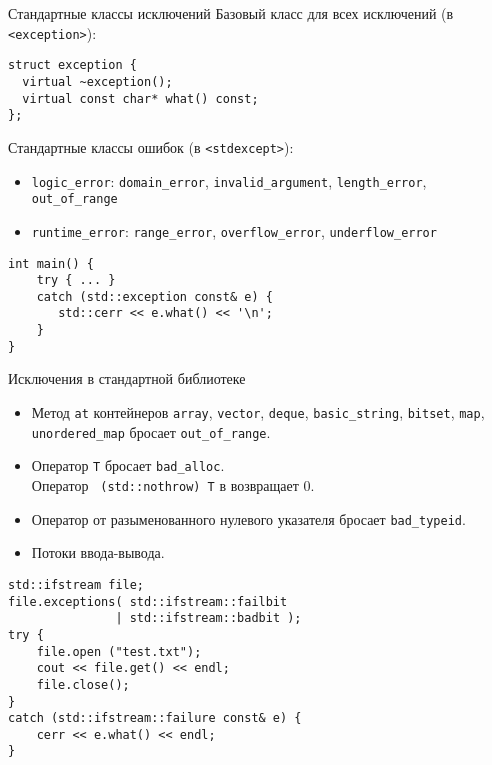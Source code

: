 \documentclass[aspectration=1610,t]{beamer}
\begin{document}
\begin{frame}[fragile]{Стандартные классы исключений}
    Базовый класс для всех исключений (в {\tt <exception>}):
    \begin{lstlisting}
struct exception {
  virtual ~exception();
  virtual const char* what() const;
}; 
    \end{lstlisting}

    Стандартные классы ошибок (в {\tt <stdexcept>}):\\
    \begin{itemize}
        \item {\tt logic\_error}: 
     {\tt domain\_error}, {\tt invalid\_argument}, {\tt length\_error}, {\tt
     out\_of\_range}\\
        \item {\tt runtime\_error}: 
        {\tt range\_error},
        {\tt overflow\_error}, 
        {\tt underflow\_error}
    \end{itemize}

\begin{lstlisting}
int main() {
    try { ... }
    catch (std::exception const& e) {
       std::cerr << e.what() << '\n';
    }
}
\end{lstlisting}
\end{frame}
 

\begin{frame}[fragile]{Исключения в стандартной библиотеке}
    \begin{itemize}
        \item Метод \texttt{at} контейнеров {\tt array}, {\tt vector}, {\tt deque}, {\tt basic\_string}, {\tt bitset}, {\tt map}, {\tt unordered\_map} бросает {\tt out\_of\_range}.

        \item Оператор  {\tt T} бросает {\tt bad\_alloc}.\\
            Оператор {\tt {} (std::nothrow) T} в возвращает 0.
            
        \item Оператор  от разыменованного нулевого указателя бросает {\tt bad\_typeid}.

        \item Потоки ввода-вывода. 
    \end{itemize}
            \begin{lstlisting}
std::ifstream file;
file.exceptions( std::ifstream::failbit 
               | std::ifstream::badbit );
try {
    file.open ("test.txt");
    cout << file.get() << endl;
    file.close();
}
catch (std::ifstream::failure const& e) {
    cerr << e.what() << endl;
}
            \end{lstlisting}
\end{frame}
\end{document}
